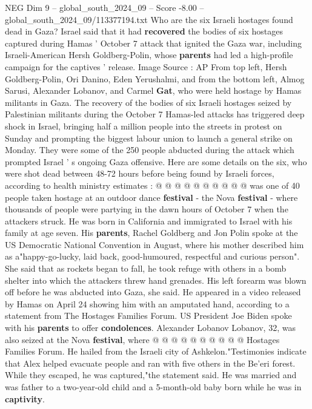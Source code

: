 \begin{textsample}{NEG Dim 9 – global\_south\_2024\_09 – Score -8.00 – global\_south\_2024\_09/113377194.txt}  \label{ex:f9_neg_109}
Who are the six Israeli hostages found dead in Gaza?
Israel said that it had \textbf{recovered} the bodies of six hostages captured during Hamas ' October 7 attack that ignited the Gaza war, including Israeli-American Hersh Goldberg-Polin, whose \textbf{parents} had led a high-profile campaign for the captives ' release.
Image Source : AP From top left, Hersh Goldberg-Polin, Ori Danino, Eden Yerushalmi, and from the bottom left, Almog Sarusi, Alexander Lobanov, and Carmel \textbf{Gat}, who were held hostage by Hamas militants in Gaza.
The recovery of the bodies of six Israeli hostages seized by Palestinian militants during the October 7 Hamas-led attacks has triggered deep shock in Israel, bringing half a million people into the streets in protest on Sunday and prompting the biggest labour union to launch a general strike on Monday.
They were some of the 250 people abducted during the attack which prompted Israel ' s ongoing Gaza offensive.
Here are some details on the six, who were shot dead between 48-72 hours before being found by Israeli forces, according to health ministry estimates : @ @ @ @ @ @ @ @ @ @ was one of 40 people taken hostage at an outdoor dance \textbf{festival} - the Nova \textbf{festival} - where thousands of people were partying in the dawn hours of October 7 when the attackers struck.
He was born in California and immigrated to Israel with his family at age seven.
His \textbf{parents}, Rachel Goldberg and Jon Polin spoke at the US Democratic National Convention in August, where his mother described him as a"happy-go-lucky, laid back, good-humoured, respectful and curious person".
She said that as rockets began to fall, he took refuge with others in a bomb shelter into which the attackers threw hand grenades.
His left forearm was blown off before he was abducted into Gaza, she said.
He appeared in a video released by Hamas on April 24 showing him with an amputated hand, according to a statement from The Hostages Families Forum.
US President Joe Biden spoke with his \textbf{parents} to offer \textbf{condolences}.
Alexander Lobanov Lobanov, 32, was also seized at the Nova \textbf{festival}, where @ @ @ @ @ @ @ @ @ @ Hostages Families Forum.
He hailed from the Israeli city of Ashkelon."Testimonies indicate that Alex helped evacuate people and ran with five others in the Be'eri forest.
While they escaped, he was captured,"the statement said.
He was married and was father to a two-year-old child and a 5-month-old baby born while he was in \textbf{captivity}.

\end{textsample}
